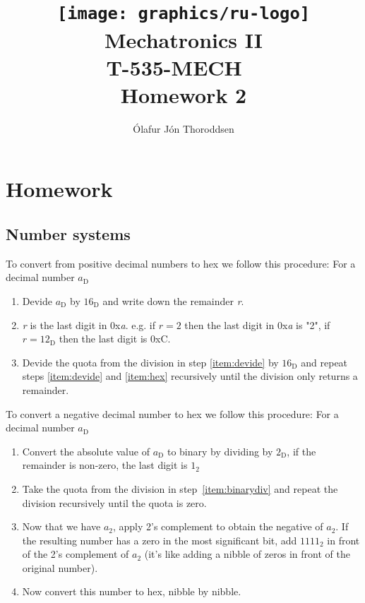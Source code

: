 \documentclass[11pt,a4paper,titlepage]{article}
\author{Ólafur Jón Thoroddsen}  %
\title{\texttt{[image: graphics/ru-logo]}\\\vspace{10mm}
	Mechatronics II\\T-535-MECH \ \\Homework 2}  %
\begin{document}
	\maketitle
	
\section{Homework}

\subsection{Number systems}

To convert from positive decimal numbers to hex we follow this procedure: For a decimal number $a_\text{D}$
\begin{enumerate}
	\item Devide $a_\text{D}$ by $16_\text{D}$ and write down the remainder \textit{r}.\label{item:devide}
	\item \textit{r} is the last digit in 0x\textit{a}. e.g. if $r = 2$ then the last digit in 0x\textit{a} is "2", if $r = 12_\text{D}$ then the last digit is 0xC.\label{item:hex}
	\item Devide the quota from the division in step \ref{item:devide} by $16_\text{D}$ and repeat steps \ref{item:devide} and \ref{item:hex} recursively until the division only returns a remainder.
\end{enumerate}

\noindent To convert a negative decimal number to hex we follow this procedure: For a decimal number $a_\text{D}$
\begin{enumerate}
		\item Convert the absolute value of $a_\text{D}$ to binary by dividing by $2_\text{D}$, if the remainder is non-zero, the last digit is $1_\text{2}$\label{item:binarydiv}
		\item Take the quota from the division in step~\ref{item:binarydiv} and repeat the division recursively until the quota is zero.
		\item Now that we have $a_2$, apply 2's complement to obtain the negative of $a_2$. If the resulting number has a zero in the most significant bit, add $1111_2$ in front of the 2's complement of $a_2$ (it's like adding a nibble of zeros in front of the original number).
		\item Now convert this number to hex, nibble by nibble.
\end{enumerate}
\end{document}
